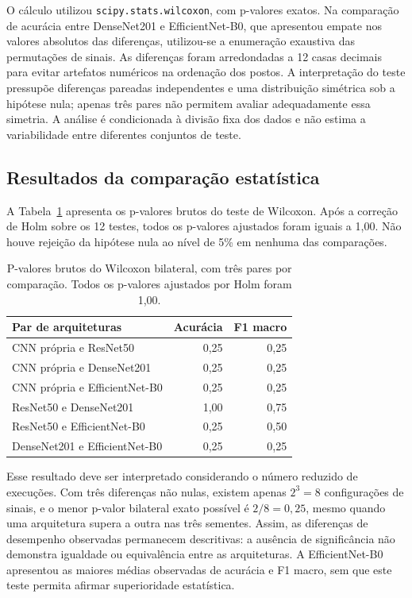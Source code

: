 O cálculo utilizou \texttt{scipy.stats.wilcoxon}, com p-valores exatos.
Na comparação de acurácia entre DenseNet201 e EfficientNet-B0, que apresentou
empate nos valores absolutos das diferenças, utilizou-se a enumeração
exaustiva das permutações de sinais. As diferenças foram arredondadas a 12 casas decimais
para evitar artefatos numéricos na ordenação dos postos. A interpretação
do teste pressupõe diferenças pareadas independentes e uma distribuição
simétrica sob a hipótese nula; apenas três pares não permitem avaliar
adequadamente essa simetria. A análise é condicionada à divisão fixa dos
dados e não estima a variabilidade entre diferentes conjuntos de teste.

\subsection{Resultados da comparação estatística}
A Tabela~\ref{tab:wilcoxon-arquiteturas} apresenta os p-valores brutos do
teste de Wilcoxon. Após a correção de Holm sobre os 12 testes, todos os
p-valores ajustados foram iguais a 1,00. Não houve rejeição da hipótese
nula ao nível de 5\% em nenhuma das comparações.

\begin{table}[t]
\centering
\caption{P-valores brutos do Wilcoxon bilateral, com três pares por
comparação. Todos os p-valores ajustados por Holm foram 1,00.}
\label{tab:wilcoxon-arquiteturas}
\small
\begin{tabular}{lrr}
\toprule
Par de arquiteturas & Acurácia & F1 macro \\
\midrule
CNN própria e ResNet50 & 0,25 & 0,25 \\
CNN própria e DenseNet201 & 0,25 & 0,25 \\
CNN própria e EfficientNet-B0 & 0,25 & 0,25 \\
ResNet50 e DenseNet201 & 1,00 & 0,75 \\
ResNet50 e EfficientNet-B0 & 0,25 & 0,50 \\
DenseNet201 e EfficientNet-B0 & 0,25 & 0,25 \\
\bottomrule
\end{tabular}
\end{table}

Esse resultado deve ser interpretado considerando o número reduzido de
execuções. Com três diferenças não nulas, existem apenas $2^3=8$
configurações de sinais, e o menor p-valor bilateral exato possível é
$2/8=0{,}25$, mesmo quando uma arquitetura supera a outra nas três
sementes. Assim, as diferenças de desempenho observadas permanecem
descritivas: a ausência de significância não demonstra igualdade ou
equivalência entre as arquiteturas. A EfficientNet-B0 apresentou as maiores
médias observadas de acurácia e F1 macro, sem que este teste permita
afirmar superioridade estatística.

